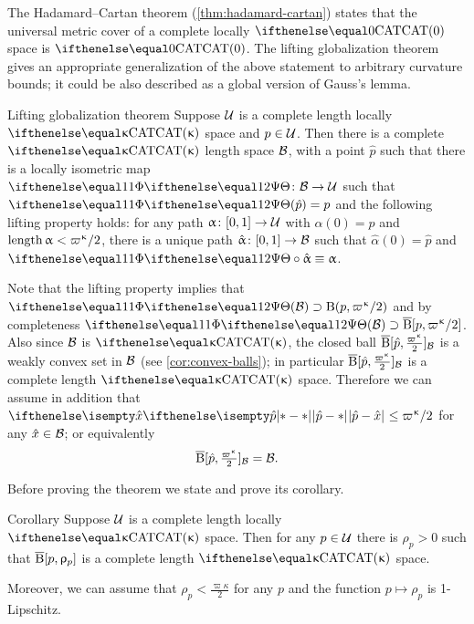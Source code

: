The Hadamard--Cartan theorem (\ref{thm:hadamard-cartan}) states that 
the universal metric cover of a complete locally $\CAT0$ space is $\CAT0$.
The lifting globalization theorem gives an appropriate generalization of the above statement to arbitrary curvature bounds;
it could be also described as a global version of Gauss's lemma.



\begin{thm}{Lifting globalization theorem}
\label{thm:globalization-lift}
Suppose $\mathcal{U}$ is a complete length locally $\CAT\kappa$ space and  $p\in\spc{U}$.
Then there is a complete $\CAT\kappa$ length space $\mathcal{B}$, 
with a point $\hat p$ such that 
there is a locally isometric map $\map\:\spc{B}\to\spc{U}$
such that $\map(\hat p)=p$ and the following lifting property holds: 
for any path $\alpha\:[0,1]\to\spc{U}$ with $\alpha(0)=p$ and $\length\alpha<\varpi\kappa/2$, 
there is a unique path $\hat\alpha \:[0,1]\to \spc{B}$ such that $\hat\alpha(0)=\hat p$ 
and $\map\circ\hat\alpha\equiv\alpha$.

\end{thm}


Note that the lifting property implies that $\map(\spc{B})\supset\oBall(p,\varpi\kappa/2)$ and by completeness $\map(\spc{B})\supset\cBall[p,\varpi\kappa/2]$.
Also since $\mathcal{B}$ is $\CAT\kappa$, the closed ball $\cBall[\hat p,\tfrac{\varpi\kappa}2]_{\spc{B}}$ is a weakly convex set in $\mathcal{B}$ (see \ref{cor:convex-balls});
in particular $\cBall[\hat p,\tfrac{\varpi\kappa}2]_{\spc{B}}$ is a complete length $\CAT\kappa$ space.
Therefore we can assume in addition that $\dist{\hat p}{\hat x}{}\le \varpi\kappa/2$ for any $\hat x\in\spc{B}$;
or equivalently
\[\cBall[\hat p,\tfrac{\varpi\kappa}2]_{\spc{B}}=\spc{B}.\]


Before proving the theorem we state and prove its corollary.

\begin{thm}{Corollary}\label{cor:loc-CAT(k)}
Suppose $\mathcal{U}$ is a complete length locally $\CAT\kappa$ space.
Then for any $p\in\spc{U}$ there is $\rho_p>0$
such that $\overline{\mathrm{B}}{}[p,\upvarrho_p]$ is a complete length $\CAT\kappa$ space.

Moreover, we can assume that $\rho_p<\tfrac{\varpi\kappa}2$
for any $p$ and the function $p\mapsto\rho_p$ is 1-Lipschitz.
\end{thm}

